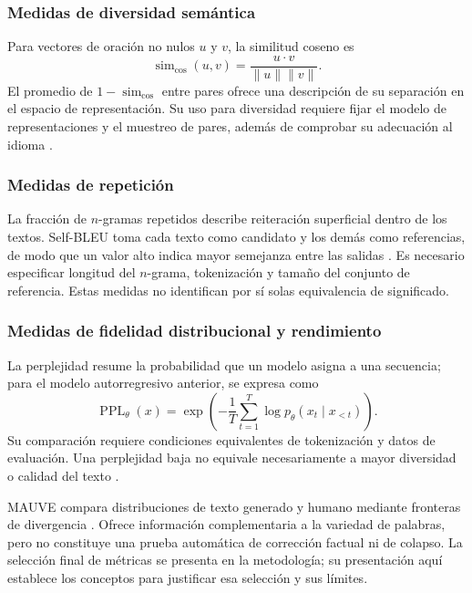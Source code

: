 \documentclass[12pt,letterpaper]{article}
\begin{document}
\subsubsection{Medidas de diversidad semántica}

Para vectores de oración no nulos \(u\) y \(v\), la similitud coseno es
\begin{equation}
    \operatorname{sim}_{\cos}(u,v)
    =\frac{u\cdot v}{\lVert u\rVert\lVert v\rVert}.
\end{equation}
El promedio de \(1-\operatorname{sim}_{\cos}\) entre pares ofrece una
descripción de su separación en el espacio de representación. Su uso
para diversidad requiere fijar el modelo de representaciones y el
muestreo de pares, además de comprobar su adecuación al idioma
\cite{reimers2019,guo2024}.

\subsubsection{Medidas de repetición}

La fracción de \(n\)-gramas repetidos describe reiteración superficial
dentro de los textos. Self-BLEU toma cada texto como candidato y los demás
como referencias, de modo que un valor alto indica mayor semejanza entre
las salidas \cite{zhu2018texygen}. Es necesario especificar longitud del
\(n\)-grama, tokenización y tamaño del conjunto de referencia. Estas
medidas no identifican por sí solas equivalencia de significado.

\subsubsection{Medidas de fidelidad distribucional y rendimiento}

La perplejidad resume la probabilidad que un modelo asigna a una secuencia;
para el modelo autorregresivo anterior, se expresa como
\begin{equation}
    \operatorname{PPL}_{\theta}(x)
    =\exp\left(-\frac{1}{T}\sum_{t=1}^{T}
    \log p_{\theta}(x_t\mid x_{<t})\right).
\end{equation}
Su comparación requiere condiciones equivalentes de tokenización y datos
de evaluación. Una perplejidad baja no equivale necesariamente a mayor
diversidad o calidad del texto \cite{guo2024}.

MAUVE compara distribuciones de texto generado y humano mediante fronteras
de divergencia \cite{pillutla2021}. Ofrece información complementaria a
la variedad de palabras, pero no constituye una prueba automática de
corrección factual ni de colapso. La selección final de métricas se
presenta en la metodología; su presentación aquí establece los conceptos
para justificar esa selección y sus límites.
\end{document}
